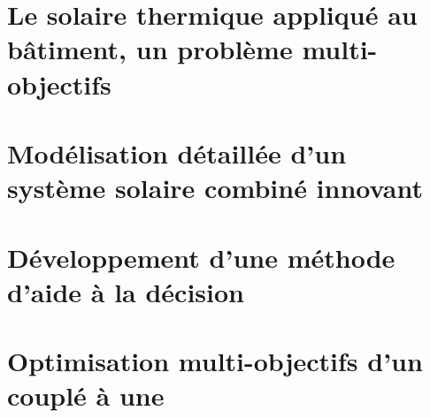 \documentclass[11pt, oneside]{JeremyThesis}
\begin{document}
\chapter{Le solaire thermique appliqué au bâtiment, un problème multi-objectifs}
% 

\chapter{Modélisation détaillée d’un système solaire combiné innovant}
% 

\chapter{Développement d’une méthode d’aide à la décision}
% 

\chapter{Optimisation multi-objectifs d’un  couplé à une }


% 
\end{document}
